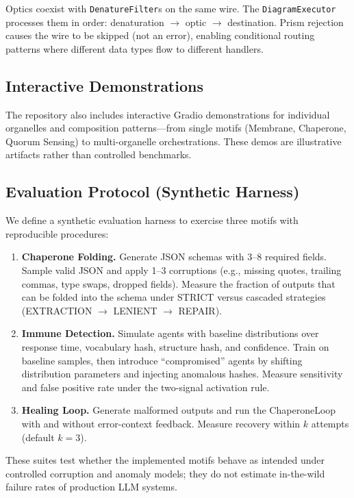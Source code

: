 Optics coexist with \texttt{DenatureFilter}s on the same wire. The \texttt{DiagramExecutor} processes them in order: denaturation $\to$ optic $\to$ destination. Prism rejection causes the wire to be skipped (not an error), enabling conditional routing patterns where different data types flow to different handlers.

\subsection{Interactive Demonstrations}

The repository also includes interactive Gradio demonstrations for individual organelles and composition
patterns---from single motifs (Membrane, Chaperone, Quorum Sensing) to multi-organelle orchestrations.
These demos are illustrative artifacts rather than controlled benchmarks.

\subsection{Evaluation Protocol (Synthetic Harness)}

We define a synthetic evaluation harness to exercise three motifs with reproducible procedures:
\begin{enumerate}[leftmargin=*]
\item \textbf{Chaperone Folding.} Generate JSON schemas with 3--8 required fields. Sample valid JSON and
apply 1--3 corruptions (e.g., missing quotes, trailing commas, type swaps, dropped fields). Measure the
fraction of outputs that can be folded into the schema under STRICT versus cascaded strategies
(EXTRACTION $\to$ LENIENT $\to$ REPAIR).
\item \textbf{Immune Detection.} Simulate agents with baseline distributions over response time,
vocabulary hash, structure hash, and confidence. Train on baseline samples, then introduce
``compromised'' agents by shifting distribution parameters and injecting anomalous hashes.
Measure sensitivity and false positive rate under the two-signal activation rule.
\item \textbf{Healing Loop.} Generate malformed outputs and run the ChaperoneLoop with and without
error-context feedback. Measure recovery within $k$ attempts (default $k=3$).
\end{enumerate}
These suites test whether the implemented motifs behave as intended under controlled corruption and anomaly
models; they do not estimate in-the-wild failure rates of production LLM systems.

